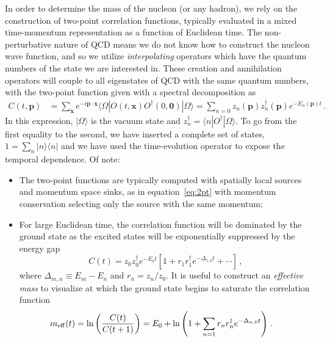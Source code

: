 In order to determine the mass of the nucleon (or any hadron), we rely on the construction of two-point correlation functions, typically evaluated in a mixed time-momentum representation as a function of Euclidean time.
The non-perturbative nature of QCD means we do not know how to construct the nucleon wave function, and so we utilize \textit{interpolating} operators which have the quantum numbers of the state we are interested in.
These creation and annihilation operators will couple to all eigenstates of QCD with the same quantum numbers, with the two-point function given with a spectral decomposition as
\begin{align}\label{eq:2pt}
    C(t,\mathbf{p}) &= \sum_{\mathbf{x}} e^{-i \mathbf{p\cdot x}}
        \langle \Omega| O(t,\mathbf{x}) O^\dagger(0,\mathbf{0}) | \Omega \rangle
    =
    \sum_{n=0} z_n(\mathbf{p}) z_n^\dagger(\mathbf{p}) e^{-E_n(\mathbf{p})t}\, .
\end{align}
In this expression, $|\Omega\rangle$ is the vacuum state and $z_n^\dagger = \langle n|O^\dagger|\Omega\rangle$.
To go from the first equality to the second, we have inserted a complete set of states, $1=\sum_n |n\rangle\langle n|$ and we have used the time-evolution operator to expose the temporal dependence.
Of note:
\begin{itemize}[leftmargin=*]
\item The two-point functions are typically computed with spatially local sources and momentum space sinks, as in equation~\eqref{eq:2pt} with momentum conservation selecting only the source with the same momentum;

\item For large Euclidean time, the correlation function will be dominated by the ground state as the excited states will be exponentially suppressed by the energy gap
\begin{equation}
    C(t) = z_0 z_0^\dagger e^{-E_0 t}\left[
        1 + r_1 r^\dagger_1 e^{-\Delta_{1,0}t} + \cdots \right]\, ,
\end{equation}
where $\Delta_{m,n} \equiv E_m - E_n$ and $r_n = z_n / z_0$.
It is useful to construct an \textit{effective mass} to visualize at which the ground state begins to saturate the correlation function
\begin{align}
m_{\rm eff}(t) &= \ln \left( \frac{C(t)}{C(t+1)} \right)
    =
    E_0 + \ln\left( 1 + \sum_{n=1} r_n r^\dagger_n e^{-\Delta_{n,0}t}\right)\, .
\end{align}

\end{itemize}
